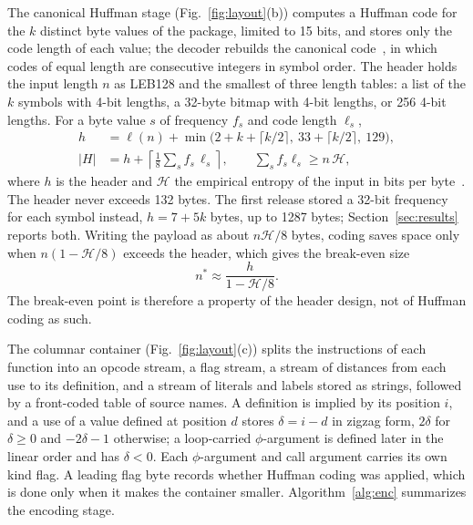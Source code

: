 \documentclass{ieeeaccess}
\begin{document}
The canonical Huffman stage (Fig.~\ref{fig:layout}(b)) computes a Huffman code for the $k$ distinct byte values of the package, limited to 15 bits, and stores only the code length of each value; the decoder rebuilds the canonical code~\cite{schwartz1964canonical}, in which codes of equal length are consecutive integers in symbol order. The header holds the input length $n$ as LEB128 and the smallest of three length tables: a list of the $k$ symbols with 4-bit lengths, a 32-byte bitmap with 4-bit lengths, or 256 4-bit lengths. For a byte value $s$ of frequency $f_s$ and code length $\ell_s$,
\begin{equation}
\begin{aligned}
h &= \ell(n)+\min\!\big(2+k+\lceil k/2\rceil,\ 33+\lceil k/2\rceil,\ 129\big),\\
|H| &= h + \left\lceil \frac{1}{8}\sum_{s} f_s\,\ell_s \right\rceil,\qquad \textstyle\sum_s f_s \ell_s \ge n\,\mathcal{H},
\end{aligned}
\label{eq:huff}
\end{equation}
where $h$ is the header and $\mathcal{H}$ the empirical entropy of the input in bits per byte~\cite{moffat2019huffman}. The header never exceeds 132 bytes. The first release stored a 32-bit frequency for each symbol instead, $h=7+5k$ bytes, up to 1287 bytes; Section~\ref{sec:results} reports both. Writing the payload as about $n\mathcal{H}/8$ bytes, coding saves space only when $n(1-\mathcal{H}/8)$ exceeds the header, which gives the break-even size
\begin{equation}
n^{\ast} \approx \frac{h}{1-\mathcal{H}/8}.
\label{eq:breakeven}
\end{equation}
The break-even point is therefore a property of the header design, not of Huffman coding as such.

The columnar container (Fig.~\ref{fig:layout}(c)) splits the instructions of each function into an opcode stream, a flag stream, a stream of distances from each use to its definition, and a stream of literals and labels stored as strings, followed by a front-coded table of source names. A definition is implied by its position $i$, and a use of a value defined at position $d$ stores $\delta=i-d$ in zigzag form, $2\delta$ for $\delta\ge0$ and $-2\delta-1$ otherwise; a loop-carried $\phi$-argument is defined later in the linear order and has $\delta<0$. Each $\phi$-argument and call argument carries its own kind flag. A leading flag byte records whether Huffman coding was applied, which is done only when it makes the container smaller. Algorithm~\ref{alg:enc} summarizes the encoding stage.
\end{document}

